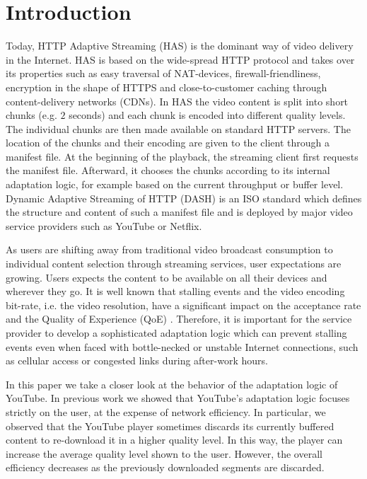 
\section{Introduction}
\label{sec:introduction}

Today, HTTP Adaptive Streaming (HAS) is the dominant way of video delivery in the Internet. 
HAS is based on the wide-spread HTTP protocol and takes over its properties such as easy traversal of NAT-devices, firewall-friendliness, encryption in the shape of HTTPS and close-to-customer caching through content-delivery networks (CDNs).
In HAS the video content is split into short chunks (e.g. $2$ seconds) and each chunk is encoded into different quality levels.
The individual chunks are then made available on standard HTTP servers.
The location of the chunks and their encoding are given to the client through a manifest file.
At the beginning of the playback, the streaming client first requests the manifest file. 
Afterward, it chooses the chunks according to its internal adaptation logic, for example based on the current throughput or buffer level.
Dynamic Adaptive Streaming of HTTP (DASH) is an ISO standard which defines the structure and content of such a manifest file and is deployed by major video service providers such as YouTube or Netflix.

As users are shifting away from traditional video broadcast consumption to individual content selection through streaming services, user expectations are growing. 
Users expects the content to be available on all their devices and wherever they go. 
It is well known that stalling events and the video encoding bit-rate, i.e. the video resolution, have a significant impact on the acceptance rate and the Quality of Experience (QoE) \cite{casas2012youtube}.
Therefore, it is important for the service provider to develop a sophisticated adaptation logic which can prevent stalling events even when faced with bottle-necked or unstable Internet connections, such as cellular access or congested links during after-work hours.

In this paper we take a closer look at the behavior of the adaptation logic of YouTube.
In previous work \cite{sieber16sacrificing} we showed that YouTube's adaptation logic focuses strictly on the user, at the expense of network efficiency.
In particular, we observed that the YouTube player sometimes discards its currently buffered content to re-download it in a higher quality level.
In this way, the player can increase the average quality level shown to the user.
However, the overall efficiency decreases as the previously downloaded segments are discarded.

